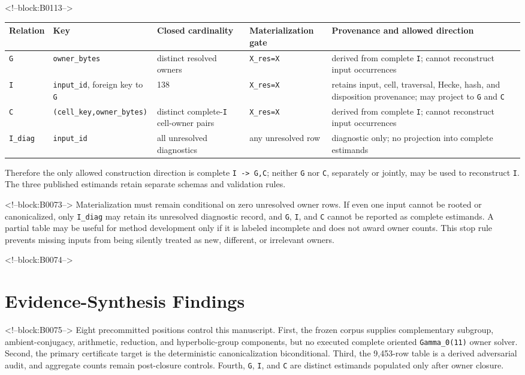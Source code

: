 \documentclass[11pt]{article}
\begin{document}
<!--block:B0113-->
\begin{center}
\scriptsize
\begin{tabular}{@{}p{.10\linewidth}p{.20\linewidth}p{.10\linewidth}p{.18\linewidth}p{.30\linewidth}@{}}
\toprule
Relation & Key & Closed cardinality & Materialization gate & Provenance and allowed direction \\
\midrule
\texttt{G} & \texttt{owner\_bytes} & distinct resolved owners & \texttt{X\_res=X} & derived from complete \texttt{I}; cannot reconstruct input occurrences \\
\texttt{I} & \texttt{input\_id}, foreign key to \texttt{G} & 138 & \texttt{X\_res=X} & retains input, cell, traversal, Hecke, hash, and disposition provenance; may project to \texttt{G} and \texttt{C} \\
\texttt{C} & \texttt{(cell\_key,owner\_bytes)} & distinct complete-\texttt{I} cell-owner pairs & \texttt{X\_res=X} & derived from complete \texttt{I}; cannot reconstruct input occurrences \\
\texttt{I\_diag} & \texttt{input\_id} & all unresolved diagnostics & any unresolved row & diagnostic only; no projection into complete estimands \\
\bottomrule
\end{tabular}
\end{center}
Therefore the only allowed construction direction is complete
\texttt{I -> G,C}; neither \texttt{G} nor \texttt{C}, separately or jointly,
may be used to reconstruct \texttt{I}.  The three published estimands retain
separate schemas and validation rules.

<!--block:B0073-->
Materialization must remain conditional on zero unresolved owner rows.
If even one input cannot be rooted or canonicalized, only \texttt{I\_diag}
may retain its unresolved diagnostic record, and \texttt{G}, \texttt{I},
and \texttt{C} cannot be reported as complete estimands. A partial table may be useful for method
development only if it is labeled incomplete and does not award owner
counts. This stop rule prevents missing inputs from being silently
treated as new, different, or irrelevant owners.

<!--block:B0074-->
\hypertarget{5-evidence-synthesis-findings}{%
\section{Evidence-Synthesis
Findings}\label{5-evidence-synthesis-findings}}

<!--block:B0075-->
Eight precommitted positions control this manuscript. First, the frozen
corpus supplies complementary subgroup, ambient-conjugacy, arithmetic,
reduction, and hyperbolic-group components, but no executed complete
oriented \texttt{Gamma\_0(11)} owner solver. Second, the primary
certificate target is the deterministic canonicalization biconditional.
Third, the 9,453-row table is a derived adversarial audit, and aggregate
counts remain post-closure controls. Fourth, \texttt{G}, \texttt{I}, and
\texttt{C} are distinct estimands populated only after owner closure.
\end{document}
